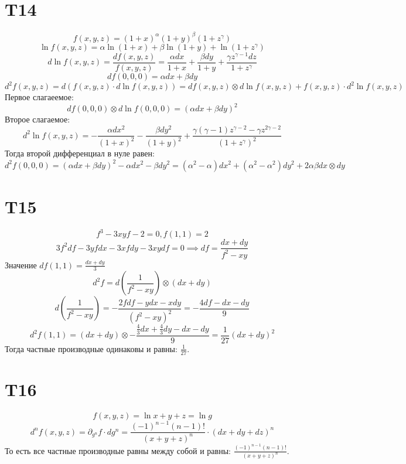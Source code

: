 \documentclass[12pt]{article}
\begin{document}
\section{T14}
\[
    f(x, y, z) = (1 + x)^\alpha(1 + y)^\beta(1 + z^\gamma)
\]
\[
    \ln{f(x, y, z)} = \alpha\ln(1 + x) + \beta\ln(1 + y) + \ln(1 + z^\gamma)
\]
\[
    d \ln{f(x, y, z)} = \frac{d f(x, y, z)}{f(x, y, z)} = \frac{\alpha dx}{1 + x} + \frac{\beta dy}{1 + y} + \frac{\gamma z^{\gamma - 1}dz}{1 + z^{\gamma} }
\]
\[
    d f(0, 0, 0) = \alpha dx + \beta dy
\]
\[
    d^2 f(x, y, z) = d \left( f(x, y, z) \cdot d \ln{f(x, y, z)} \right) = d f(x, y, z) \otimes d \ln{f(x, y, z)} + f(x, y, z) \cdot d^2 \ln{f(x, y, z)} 
\]
Первое слагаеемое:
\[
    d f(0, 0, 0) \otimes d \ln{f(0, 0, 0)} = (\alpha dx + \beta dy)^{2}
\]
Второе слагаемое:
\[
    d^2 \ln{f(x, y, z)} = -\frac{\alpha dx^{2}}{(1 + x)^{2}} - \frac{\beta dy^{2}}{(1 + y)^{2}} + \frac{\gamma (\gamma - 1) z^{\gamma -2} - \gamma z^{2\gamma -2}}{(1 + z^{\gamma})^{2} }
\]
Тогда второй дифференциал в нуле равен:
\[
    d^2 f(0, 0, 0) = (\alpha dx + \beta dy)^{2} - \alpha dx^{2} - \beta dy^{2} = (\alpha^{2} - \alpha)dx^{2}  + (\alpha ^{2} -\alpha ^{2} )dy^{2} + 2\alpha \beta dx \otimes dy
\]
\section{T15}
\[
    f^3 - 3xyf - 2 = 0, f(1, 1) = 2
\]
\[
    3f^2 df - 3yf dx - 3xf dy - 3xy df = 0 \implies df = \frac{dx + dy}{f^2 - xy}
\]
Значение \(df(1, 1) = \frac{dx + dy}{3}\) 
\[
    d^2 f = d \left( \frac{1}{f^2 - xy} \right) \otimes (dx + dy) 
\]
\[
    d \left( \frac{1}{f^2 - xy} \right) = -\frac{2f df - ydx - x dy}{(f^2 - xy)^2} = -\frac{4df - dx - dy}{9}
\]
\[
    d^2 f(1, 1) = (dx + dy) \otimes -\frac{\frac{4}{3}dx + \frac{4}{3}dy - dx - dy}{9} = \frac{1}{27}(dx + dy)^2 
\]
Тогда частные производные одинаковы и равны: \(\frac{1}{27}\). 
\section{T16}
\[
    f(x, y, z) = \ln{x + y + z} = \ln g
\]
\[
    d^n f(x, y, z) = \partial_{g^n} f \cdot dg^n = \frac{(-1)^{n - 1} (n - 1)!}{(x + y + z)^n} \cdot (dx + dy + dz)^n
\]
То есть все частные производные равны между собой и равны: \(\frac{(-1)^{n - 1} (n - 1)!}{(x + y + z)^n}\). 
\end{document}
